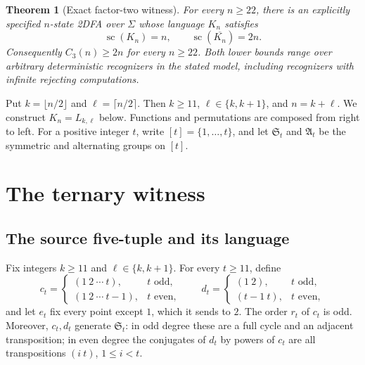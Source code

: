 \documentclass[11pt,a4paper]{article}
\newtheorem{theorem}{Theorem}[section]
\theoremstyle{definition}
\theoremstyle{remark}
\newcommand{\Alt}{\mathfrak A}
\newcommand{\Sym}{\mathfrak S}
\newcommand{\statecomplexity}{\operatorname{sc}}
\begin{document}
\begin{theorem}[Exact factor-two witness]\label{thm:main}
For every $n\ge22$, there is an explicitly specified $n$-state 2DFA
over $\Sigma$ whose language $K_n$ satisfies
\[
 \statecomplexity(K_n)=n,\qquad \statecomplexity(\overline{K_n})=2n.
\]
Consequently $C_3(n)\ge2n$ for every $n\ge22$. Both lower bounds
range over arbitrary deterministic recognizers in the stated model,
including recognizers with infinite rejecting computations.
\end{theorem}

Put $k=\lfloor n/2\rfloor$ and $\ell=\lceil n/2\rceil$. Then
$k\ge11$, $\ell\in\{k,k+1\}$, and $n=k+\ell$.
We construct $K_n=L_{k,\ell}$ below. Functions and permutations are
composed from right to left. For a positive integer $t$, write
$[t]=\{1,\ldots,t\}$, and let $\Sym_t$ and $\Alt_t$ be the
symmetric and alternating groups on $[t]$.

\section{The ternary witness}
\label{sec:new-witness}

\subsection{The source five-tuple and its language}

Fix integers $k\ge 11$ and $\ell\in\{k,k+1\}$. For every $t\ge 11$, define
\[
 c_t=\begin{cases}(1\ 2\ \cdots\ t),&t\text{ odd},\\
                  (1\ 2\ \cdots\ t-1),&t\text{ even},\end{cases}
 \qquad
 d_t=\begin{cases}(1\ 2),&t\text{ odd},\\
                  (t-1\ t),&t\text{ even},\end{cases}
\]
and let $e_t$ fix every point except $1$, which it sends to $2$.
The order $r_t$ of $c_t$ is odd. Moreover, $c_t,d_t$ generate $\Sym_t$:
in odd degree these are a full cycle and an adjacent transposition; in even
degree the conjugates of $d_t$ by powers of $c_t$ are all transpositions
$(i\ t)$, $1\le i<t$.
\end{document}
